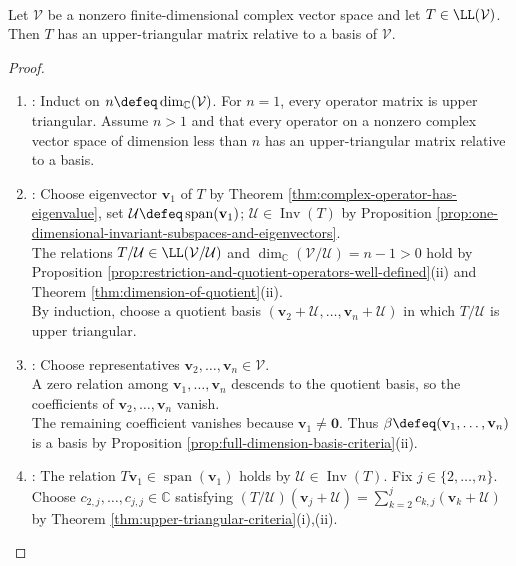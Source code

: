\begin{theorem} \label{thm:complex-upper-triangularization} \\
Let $\mathcal{V}$ be a nonzero finite-dimensional complex vector space and let $T\in\LL(\mathcal{V})$.\\
Then $T$ has an upper-triangular matrix relative to a basis of $\mathcal{V}$.
\begin{proof}
\begin{enumerate}[label=(\roman*)]
\setlength{\itemsep}{0pt}
\item {}: Induct on $n\defeq\dim_{\mathbb{C}}(\mathcal{V})$. For $n=1$, every operator matrix is upper triangular. Assume $n>1$ and that every operator on a nonzero complex vector space of dimension less than $n$ has an upper-triangular matrix relative to a basis.
\item {}: Choose eigenvector $\mathbf{v}_1$ of $T$ by Theorem \ref{thm:complex-operator-has-eigenvalue}, set $\mathcal{U}\defeq\operatorname{span}(\mathbf{v}_1)$; $\mathcal{U}\in\operatorname{Inv}(T)$ by Proposition \ref{prop:one-dimensional-invariant-subspaces-and-eigenvectors}.\\
The relations $T/\mathcal{U}\in\LL(\mathcal{V}/\mathcal{U})$ and $\dim_{\mathbb{C}}(\mathcal{V}/\mathcal{U})=n-1>0$ hold by Proposition \ref{prop:restriction-and-quotient-operators-well-defined}(ii) and Theorem \ref{thm:dimension-of-quotient}(ii).\\
By induction, choose a quotient basis $(\mathbf{v}_2+\mathcal{U},\ldots,\mathbf{v}_n+\mathcal{U})$ in which $T/\mathcal{U}$ is upper triangular.
\item {}: Choose representatives $\mathbf{v}_2,\ldots,\mathbf{v}_n\in\mathcal{V}$.\\
A zero relation among $\mathbf{v}_1,\ldots,\mathbf{v}_n$ descends to the quotient basis, so the coefficients of $\mathbf{v}_2,\ldots,\mathbf{v}_n$ vanish.\\
The remaining coefficient vanishes because $\mathbf{v}_1\neq\mathbf{0}$. Thus $\beta\defeq(\mathbf{v}_1,\ldots,\mathbf{v}_n)$ is a basis by Proposition \ref{prop:full-dimension-basis-criteria}(ii).
\item {}: The relation $T\mathbf{v}_1\in\operatorname{span}(\mathbf{v}_1)$ holds by $\mathcal{U}\in\operatorname{Inv}(T)$. Fix $j\in\{2,\ldots,n\}$.\\
Choose $c_{2,j},\ldots,c_{j,j}\in\mathbb{C}$ satisfying $(T/\mathcal{U})(\mathbf{v}_j+\mathcal{U})=\sum\limits_{k=2}^{j}c_{k,j}(\mathbf{v}_k+\mathcal{U})$ by Theorem \ref{thm:upper-triangular-criteria}(i),(ii).\\

\end{enumerate}
\end{proof}
\end{theorem}
